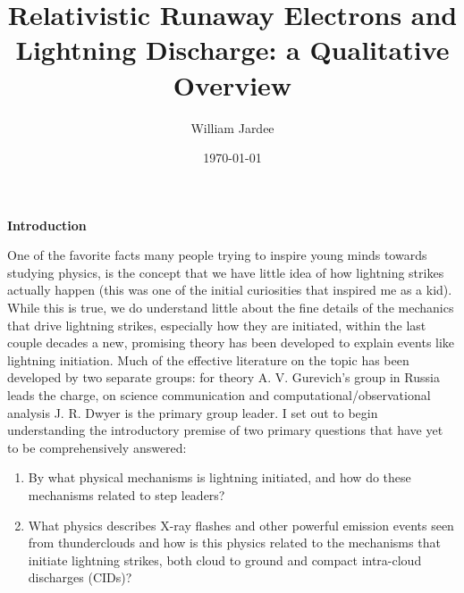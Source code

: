 \documentclass[11pt]{article}
\begin{document}
\graphicspath{{images/}}

\title{Relativistic Runaway Electrons and Lightning Discharge: a Qualitative Overview}
\author{William Jardee}
\date{\today}
\maketitle




    \noindent
{\bf \LARGE Introduction}

    One of the favorite facts many people trying to inspire young minds towards studying physics, is the concept that we have little idea of how lightning strikes actually happen (this was one of the initial curiosities that inspired me as a kid). While this is true, we do understand little about the fine details of the mechanics that drive lightning strikes, especially how they are initiated, within the last couple decades a new, promising theory has been developed to explain events like lightning initiation. Much of the effective literature on the topic has been developed by two separate groups: for theory A. V. Gurevich's group in Russia leads the charge, on science communication and computational/observational analysis J. R. Dwyer is the primary group leader. I set out to begin understanding the introductory premise of two primary questions that have yet to be comprehensively answered:
    \begin{enumerate}
            \item By what physical mechanisms is lightning initiated, and how do these mechanisms related to step leaders?
            \item What physics describes X-ray flashes and other powerful emission events seen from thunderclouds and how is this physics related to the mechanisms that initiate lightning strikes, both cloud to ground and compact intra-cloud discharges (CIDs)? 
    \end{enumerate}
\end{document}
